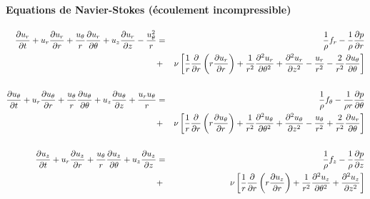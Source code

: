 %
%
%
%
%





\paragraph{Equations de Navier-Stokes (écoulement incompressible)}

\begin{eqnarray*}
\dpa{u_r}{t} + u_r \dpa{u_r}{r} + \frac{u_{\theta}}{r} \dpa{u_r}{\theta} + u_z \dpa{u_r}{z} - \frac{u_{\theta}^2}{r} & = &
\frac{1}{\rho} f_r - \frac{1}{\rho} \dpa{p}{r} \\
& + & \nu \left[ \frac{1}{r} \dpa{}{r} \left( r \dpa{u_r}{r} \right) + 
             \frac{1}{r^2} \ddpa{u_r}{\theta} + \ddpa{u_r}{z} -
             \frac{u_r}{r^2} - \frac{2}{r^2} \dpa{u_{\theta}}{\theta} \right] \\
\\
\dpa{u_{\theta}}{t} + u_r \dpa{u_{\theta}}{r} + \frac{u_{\theta}}{r} \dpa{u_{\theta}}{\theta} + u_z \dpa{u_{\theta}}{z} + \frac{u_r u_{\theta}}{r} & = &
\frac{1}{\rho} f_{\theta} - \frac{1}{\rho r} \dpa{p}{\theta} \\
& + & \nu \left[ \frac{1}{r} \dpa{}{r} \left( r \dpa{u_{\theta}}{r} \right) + 
             \frac{1}{r^2} \ddpa{u_{\theta}}{\theta} + \ddpa{u_{\theta}}{z} -
             \frac{u_{\theta}}{r^2} + \frac{2}{r^2} \dpa{u_r}{\theta} \right] \\
\\
\dpa{u_z}{t} + u_r \dpa{u_z}{r} + \frac{u_{\theta}}{r} \dpa{u_z}{\theta} + u_z \dpa{u_z}{z} & = &
\frac{1}{\rho} f_z - \frac{1}{\rho} \dpa{p}{z} \\
& + & \nu \left[ \frac{1}{r} \dpa{}{r} \left( r \dpa{u_z}{r} \right) + 
             \frac{1}{r^2} \ddpa{u_z}{\theta} + \ddpa{u_z}{z} \right]
\end{eqnarray*}


